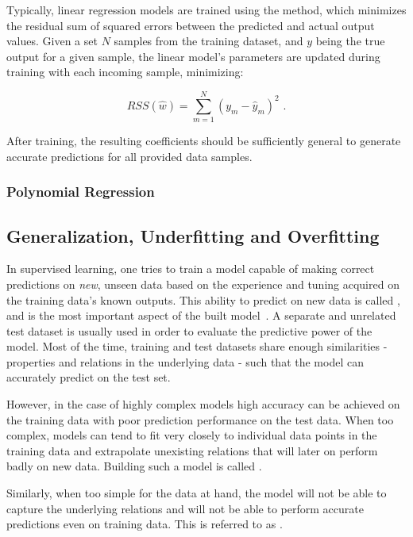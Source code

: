 Typically, linear regression models are trained using the  method, which minimizes the residual sum of squared errors between the predicted and actual output values.
Given a set \(N\) samples from the training dataset, and \(y\) being the true output for a given sample, the linear model's parameters are updated during training with each incoming sample, minimizing:

\begin{equation}
    RSS(\hat{w}) = \sum_{m=1}^{N} (y_m - \hat{y}_m)^2 \text{ .}
    \label{equation:least_squares_rss}
\end{equation}

After training, the resulting coefficients should be sufficiently general to generate accurate predictions for all provided data samples.

\subsubsection*{Polynomial Regression}



\subsection{Generalization, Underfitting and Overfitting}

In supervised learning, one tries to train a model capable of making correct predictions on \textit{new}, unseen data based on the experience and tuning acquired on the training data's known outputs.
This ability to predict on new data is called , and is the most important aspect of the built model~\cite{PR:Rosenblatt:Perceptron,BOOK:Bishop:Neural_Networks_Pattern_Recognition}.
A separate and unrelated test dataset is usually used in order to evaluate the predictive power of the model.
Most of the time, training and test datasets share enough similarities - properties and relations in the underlying data - such that the model can accurately predict on the test set.

However, in the case of highly complex models high accuracy can be achieved on the training data with poor prediction performance on the test data.
When too complex, models can tend to fit very closely to individual data points in the training data and extrapolate unexisting relations that will later on perform badly on new data.
Building such a model is called .

Similarly, when too simple for the data at hand, the model will not be able to capture the underlying relations and will not be able to perform accurate predictions even on training data.
This is referred to as .

